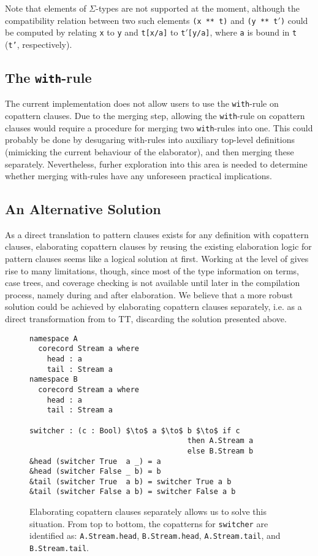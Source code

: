 Note that elements of $\Sigma$-types are
not supported at the moment, although the compatibility relation between two
such elements \texttt{(x~**~t)} and \texttt{(y~**~t$'$)} could be computed by
relating \texttt{x} to \texttt{y} and \texttt{t[x/a]} to \texttt{t$'$[y/a]},
where \texttt{a} is bound in \texttt{t} (\texttt{t'}, respectively).

\subsection{The \texttt{with}-rule}
\label{sec:textttwith-rule}
The current implementation does not allow users to use the \texttt{with}-rule on
copattern clauses. Due to the merging step, allowing the \texttt{with}-rule on
copattern clauses would require a procedure for merging two
\texttt{with}-rules into one. This could probably be done by desugaring
with-rules into auxiliary top-level definitions (mimicking the current behaviour
of the elaborator), and then merging these separately. Nevertheless, furher
exploration into this area is needed to determine whether merging with-rules
have any unforeseen practical implications.

\subsection{An Alternative Solution}
\label{sec:an-altern-solut}
As a direct translation to pattern clauses exists for any definition with
copattern clauses, elaborating copattern clauses by reusing the existing
elaboration logic for pattern clauses seems like a logical solution at
first. Working at the level of \IdrisM{} gives rise to many limitations, though,
since most of the type information on terms, case trees, and coverage checking
is not available until later in the compilation process, namely during and after
elaboration. We believe that a more robust solution could be achieved by
elaborating copattern clauses separately, i.e. as a direct transformation from
\IdrisM{} to TT, discarding the solution presented
above.

\begin{figure}[h]
\begin{lstlisting}[mathescape,title=\idrisBlock]
namespace A
  corecord Stream a where
    head : a
    tail : Stream a
namespace B
  corecord Stream a where
    head : a
    tail : Stream a

switcher : (c : Bool) $\to$ a $\to$ b $\to$ if c
                                    then A.Stream a 
                                    else B.Stream b
&head (switcher True  a _) = a
&head (switcher False _ b) = b
&tail (switcher True  a b) = switcher True a b
&tail (switcher False a b) = switcher False a b   
\end{lstlisting}
  \caption{Elaborating copattern clauses separately allows us to solve this
    situation. From top to bottom, the copatterns for \texttt{switcher} are
    identified as: \texttt{A.Stream.head}, \texttt{B.Stream.head},
    \texttt{A.Stream.tail}, and \texttt{B.Stream.tail}.}
  \label{fig:copatterns_type_disambiguation}
\end{figure}

